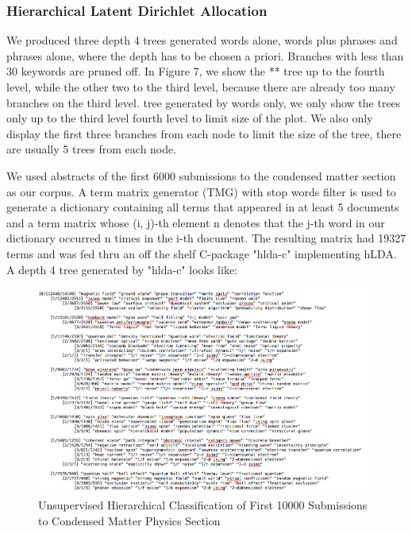 \documentclass[DIV=calc, paper=letter, fontsize=10pt, twocolumn]{scrartcl}	 %
\begin{document}
\subsubsection*{Hierarchical Latent Dirichlet Allocation}
 We produced three depth 4 trees generated words alone, words plus phrases and phrases alone, where the depth has to be chosen a priori. Branches with less than 30 keywords are pruned off. In Figure 7, we show the ** tree up to the fourth level, while the other two to the third level, because there are already too many branches on the third level. tree generated by words only, we only show the trees only up to the third level  fourth level to limit size of the plot. We also only display the first three branches from each node to limit the size of the tree, there are usually 5 trees from each node.

We used abstracts of the first 6000 submissions to the condensed matter section as our corpus. A term matrix generator (TMG) \cite{5} with stop words filter is used to generate a dictionary containing all terms that appeared in at least 5 documents and a term matrix whose (i, j)-th element n denotes that the j-th word in our dictionary occurred n times in the i-th document. The resulting matrix had 19327 terms and was fed thru an off the shelf C-package "hlda-c" \cite{1} implementing hLDA.\\
A depth 4 tree generated by "hlda-c" looks like:\newline
			\begin{figure}[!ht]
				\centerline{\includegraphics[scale = 0.35]{phrase.png}}
				\caption{Unsupervised Hierarchical Classification of First 10000 Submissions to Condensed Matter Physics Section}
			\end{figure}
\newline
\end{document}

